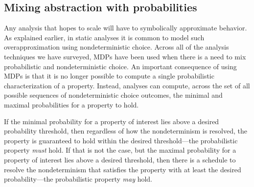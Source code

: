 \subsection{Mixing abstraction with probabilities}
Any analysis that hopes to scale will have to symbolically approximate
behavior.  As explained earlier, in static analyses it is common
to model such overapproximation using nondeterministic choice.
Across all of the analysis techniques we have surveyed, MDPs
have been used when there is a need to mix probabilistic
and nondeterministic choice.   
An important consequence of using MDPs is that it is no longer possible
to compute a single probabilistic characterization of a property.
Instead, analyses can compute, across the set of all possible sequences
of nondeterministic choice outcomes, the minimal and maximal 
probabilities for a property to hold.

If the minimal probability for a property of interest lies above 
a desired probability threshold, then regardless of how the nondeterminism
is resolved, the property is guaranteed to hold within the desired 
threshold---the probabilistic property \textit{must} hold.  
If that is not the case, but the maximal probability for
a property of interest lies above a desired threshold, then there
is a schedule to resolve the nondeterminism that satisfies
the property with at least the desired probability---the probabilistic property \textit{may} hold.

